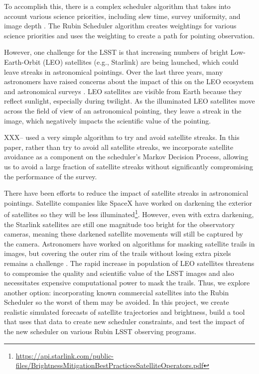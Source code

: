 \documentclass[linenumbers]{aastex631}
\begin{document}
To accomplish this, there is a complex scheduler algorithm that takes into account various science priorities, including slew time, survey uniformity, and image depth \citep{naghib19}. The Rubin Scheduler algorithm creates weightings for various science priorities and uses the weighting to create a path for pointing observation.

However, one challenge for the LSST is that increasing numbers of bright Low-Earth-Orbit (LEO) satellites (e.g., Starlink) are being launched, which could leave streaks in astronomical pointings. Over the last three years, many astronomers have raised concerns about the impact of this on the LEO ecosystem and astronomical surveys \citep{lawrence22,tyson20}. LEO satellites are visible from Earth because they reflect sunlight, especially during twilight. As the illuminated LEO satellites move across the field of view of an astronomical pointing, they leave a streak in the image, which negatively impacts the scientific value of the pointing.

XXX--\citet{tyson20} used a very simple algorithm to try and avoid satellite streaks.  In this paper, rather than try to avoid all satellite streaks, we incorporate satellite avoidance as a component on the scheduler's Markov Decision Process, allowing us to avoid a large fraction of satellite streaks without significantly compromising the performance of the survey. 

There have been efforts to reduce the impact of satellite streaks in astronomical pointings. Satellite companies like SpaceX have worked on darkening the exterior of satellites so they will be less illuminated\footnote{\url{https://api.starlink.com/public-files/BrightnessMitigationBestPracticesSatelliteOperators.pdf}}. However, even with extra darkening, the Starlink satellites are still one magnitude too bright for the observatory cameras, meaning these darkened satellite movements will still be captured by the camera. Astronomers have worked on algorithms for masking satellite trails in images, but covering the outer rim of the trails without losing extra pixels remains a challenge \citep{tyson20}. The rapid increase in population of LEO satellites threatens to compromise the quality and scientific value of the LSST images and also necessitates expensive computational power to mask the trails. Thus, we explore another option: incorporating known commercial satellites into the Rubin Scheduler so the worst of them may be avoided. In this project, we create realistic simulated forecasts of satellite trajectories and brightness, build a tool that uses that data to create new scheduler constraints, and test the impact of the new scheduler on various Rubin LSST observing programs.
\end{document}
